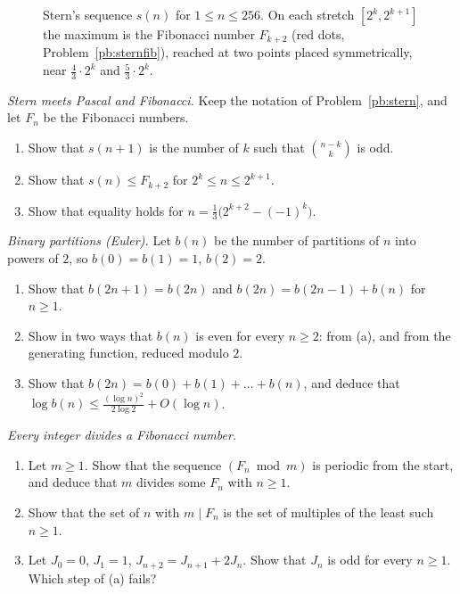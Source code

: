 \begin{figure}[ht]
\centering
{}
\caption{Stern's sequence $s(n)$ for $1\le n\le256$. On each stretch $[2^k,2^{k+1}]$ the maximum is the Fibonacci number $F_{k+2}$
(red dots, Problem~\ref{pb:sternfib}), reached at two points placed symmetrically, near $\frac43\cdot2^k$ and $\frac53\cdot2^k$.}
\label{fig:stern}
\end{figure}

\begin{exercise}[$\star\star$]\label{pb:sternfib}
\emph{Stern meets Pascal and Fibonacci.} Keep the notation of Problem~\ref{pb:stern}, and let $F_n$ be the Fibonacci numbers.
\begin{enumerate}[label=(\alph*)]
\item Show that $s(n+1)$ is the number of $k$ such that $\binom{n-k}k$ is odd.
\item Show that $s(n)\le F_{k+2}$ for $2^k\le n\le2^{k+1}$.
\item Show that equality holds for $n=\frac13\bigl(2^{k+2}-(-1)^k\bigr)$.
\end{enumerate}
\end{exercise}

\begin{exercise}[$\star\star$]\label{pb:binarypart}
\emph{Binary partitions (Euler).} Let $b(n)$ be the number of partitions of $n$ into powers of $2$, so $b(0)=b(1)=1$, $b(2)=2$.
\begin{enumerate}[label=(\alph*)]
\item Show that $b(2n+1)=b(2n)$ and $b(2n)=b(2n-1)+b(n)$ for $n\ge1$.
\item Show in two ways that $b(n)$ is even for every $n\ge2$: from (a), and from the generating function, reduced modulo $2$.
\item Show that $b(2n)=b(0)+b(1)+\dots+b(n)$, and deduce that $\log b(n)\le\frac{(\log n)^2}{2\log2}+O(\log n)$.
\end{enumerate}
\end{exercise}

\begin{exercise}[$\star$]\label{pb:fibdivides}
\emph{Every integer divides a Fibonacci number.}
\begin{enumerate}[label=(\alph*)]
\item Let $m\ge1$. Show that the sequence $(F_n\bmod m)$ is periodic from the start, and deduce that $m$ divides some $F_n$ with
$n\ge1$.
\item Show that the set of $n$ with $m\mid F_n$ is the set of multiples of the least such $n\ge1$.
\item Let $J_0=0$, $J_1=1$, $J_{n+2}=J_{n+1}+2J_n$. Show that $J_n$ is odd for every $n\ge1$. Which step of (a) fails?
\end{enumerate}
\end{exercise}

